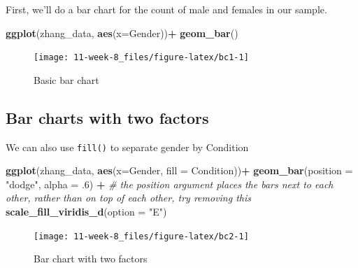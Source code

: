 \documentclass[]{book}
\newenvironment{Shaded}{\begin{snugshade}}{\end{snugshade}}
\newcommand{\CommentTok}[1]{\textcolor[rgb]{0.56,0.35,0.01}{\textit{#1}}}
\newcommand{\DataTypeTok}[1]{\textcolor[rgb]{0.13,0.29,0.53}{#1}}
\newcommand{\FloatTok}[1]{\textcolor[rgb]{0.00,0.00,0.81}{#1}}
\newcommand{\KeywordTok}[1]{\textcolor[rgb]{0.13,0.29,0.53}{\textbf{#1}}}
\newcommand{\NormalTok}[1]{#1}
\newcommand{\OperatorTok}[1]{\textcolor[rgb]{0.81,0.36,0.00}{\textbf{#1}}}
\newcommand{\StringTok}[1]{\textcolor[rgb]{0.31,0.60,0.02}{#1}}
\begin{document}
First, we'll do a bar chart for the count of male and females in our sample.

\begin{Shaded}
\begin{Highlighting}[]
\KeywordTok{ggplot}\NormalTok{(zhang_data, }\KeywordTok{aes}\NormalTok{(}\DataTypeTok{x=}\NormalTok{Gender))}\OperatorTok{+}
\StringTok{  }\KeywordTok{geom_bar}\NormalTok{()}
\end{Highlighting}
\end{Shaded}

\begin{figure}

{\centering \texttt{[image: 11-week-8\_files/figure-latex/bc1-1]} 

}

\caption{Basic bar chart}\label{fig:bc1}
\end{figure}

\hypertarget{bar-charts-with-two-factors}{%
\subsection{Bar charts with two factors}\label{bar-charts-with-two-factors}}

We can also use \texttt{fill()} to separate gender by Condition

\begin{Shaded}
\begin{Highlighting}[]
\KeywordTok{ggplot}\NormalTok{(zhang_data, }\KeywordTok{aes}\NormalTok{(}\DataTypeTok{x=}\NormalTok{Gender, }\DataTypeTok{fill =}\NormalTok{ Condition))}\OperatorTok{+}
\StringTok{  }\KeywordTok{geom_bar}\NormalTok{(}\DataTypeTok{position =} \StringTok{"dodge"}\NormalTok{, }\DataTypeTok{alpha =} \FloatTok{.6}\NormalTok{) }\OperatorTok{+}\StringTok{ }\CommentTok{# the position argument places the bars next to each other, rather than on top of each other, try removing this}
\StringTok{  }\KeywordTok{scale_fill_viridis_d}\NormalTok{(}\DataTypeTok{option =} \StringTok{"E"}\NormalTok{)}
\end{Highlighting}
\end{Shaded}

\begin{figure}

{\centering \texttt{[image: 11-week-8\_files/figure-latex/bc2-1]} 

}

\caption{Bar chart with two factors}\label{fig:bc2}
\end{figure}
\end{document}
